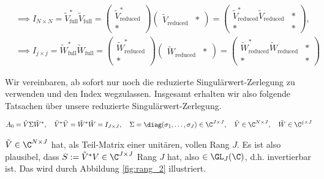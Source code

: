 \begin{align*}
    & \implies
    I_{N \times N}
    =
    \tilde V_\mathrm{full}^\ast \tilde V_\mathrm{full}
    =
    \begin{pmatrix}
        \tilde V_\mathrm{reduced}^\ast \\ \ast
    \end{pmatrix}
    \begin{pmatrix}
        \tilde V_\mathrm{reduced} & \ast
    \end{pmatrix}
    =
    \begin{pmatrix}
        \tilde V_\mathrm{reduced}^\ast \tilde V_\mathrm{reduced} & \ast \\
        \ast                                                     & \ast
    \end{pmatrix}, \\
    & \implies
    I_{j \times j}
    =
    \tilde W_\mathrm{full}^\ast \tilde W_\mathrm{full}
    =
    \begin{pmatrix}
        \tilde W_\mathrm{reduced}^\ast \\ \ast
    \end{pmatrix}
    \begin{pmatrix}
        \tilde W_\mathrm{reduced} & \ast
    \end{pmatrix}
    =
    \begin{pmatrix}
        \tilde W_\mathrm{reduced}^\ast \tilde W_\mathrm{reduced} & \ast \\
        \ast                                                     & \ast
    \end{pmatrix}
\end{align*}

Wir vereinbaren, ab sofort nur noch die reduzierte Singulärwert-Zerlegung zu verwenden und den Index wegzulassen.
Insgesamt erhalten wir also folgende Tatsachen über unsere reduzierte Singulärwert-Zerlegung.

\begin{align} \label{eq:singulärwert_zerlegung}
    A_0 = \tilde V \Sigma \tilde W^\ast,
    \quad
    \tilde V^\ast \tilde V
    =
    \tilde W^\ast \tilde W
    =
    I_{J \times J},
    \quad
    \Sigma = \diag(\sigma_1, \dots, \sigma_J) \in \C^{J \times J},
    \quad
    \tilde V \in \C^{N \times J},
    \quad
    \tilde W \in \C^{j \times J}
\end{align}

$\tilde V \in \C^{N \times J}$ hat, als Teil-Matrix einer unitären, vollen Rang $J$.
Es ist also plausibel, dass $S := \tilde V^\ast V \in \C^{J \times J}$ Rang $J$ hat, also $\in \GL_J(\C)$, d.h. invertierbar ist.
Das wird durch Abbildung \ref{fig:rang_2} illustriert.

